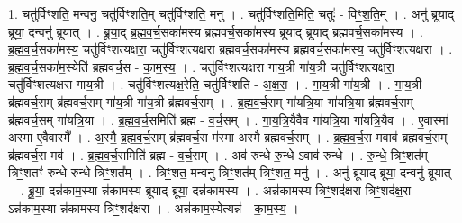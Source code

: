 \documentclass[17pt]{extarticle}
\begin{document}
1. चतु॑र्विꣳशति॒ मन्वनु॒ चतु॑र्विꣳशति॒म् चतु॑र्विꣳशति॒ मनु॑ । . चतु॑र्विꣳशति॒मिति॒ चतुः॑ - विꣳ॒॒श॒ति॒म् । . अनु॑ ब्रूयाद् ब्रूया॒ दन्वनु॑ ब्रूयात् । . ब्रू॒या॒द् ब्र॒ह्म॒व॒र्च॒सका॑मस्य ब्रह्मवर्च॒सका॑मस्य ब्रूयाद् ब्रूयाद् ब्रह्मवर्च॒सका॑मस्य । . ब्र॒ह्म॒व॒र्च॒सका॑मस्य॒ चतु॑र्विꣳशत्यक्षरा॒ चतु॑र्विꣳशत्यक्षरा ब्रह्मवर्च॒सका॑मस्य ब्रह्मवर्च॒सका॑मस्य॒ चतु॑र्विꣳशत्यक्षरा । . ब्र॒ह्म॒व॒र्च॒सका॑म॒स्येति॑ ब्रह्मवर्च॒स - का॒म॒स्य॒ । . चतु॑र्विꣳशत्यक्षरा गाय॒त्री गा॑य॒त्री चतु॑र्विꣳशत्यक्षरा॒ चतु॑र्विꣳशत्यक्षरा गाय॒त्री । . चतु॑र्विꣳशत्यक्ष॒रेति॒ चतु॑र्विꣳशति - अ॒क्ष॒रा॒ । . गा॒य॒त्री गा॑य॒त्री । . गा॒य॒त्री ब्र॑ह्मवर्च॒सम् ब्र॑ह्मवर्च॒सम् गा॑य॒त्री गा॑य॒त्री ब्र॑ह्मवर्च॒सम् । . ब्र॒ह्म॒व॒र्च॒सम् गा॑यत्रि॒या गा॑यत्रि॒या ब्र॑ह्मवर्च॒सम् ब्र॑ह्मवर्च॒सम् गा॑यत्रि॒या । . ब्र॒ह्म॒व॒र्च॒समिति॑ ब्रह्म - व॒र्च॒सम् । . गा॒य॒त्रि॒यैवैव गा॑यत्रि॒या गा॑यत्रि॒यैव । . ए॒वास्मा॑ अस्मा ए॒वैवास्मै᳚ । . अ॒स्मै॒ ब्र॒ह्म॒व॒र्च॒सम् ब्र॑ह्मवर्च॒स म॑स्मा अस्मै ब्रह्मवर्च॒सम् । . ब्र॒ह्म॒व॒र्च॒स मवाव॑ ब्रह्मवर्च॒सम् ब्र॑ह्मवर्च॒स मव॑ । . ब्र॒ह्म॒व॒र्च॒समिति॑ ब्रह्म - व॒र्च॒सम् । . अव॑ रुन्धे रु॒न्धे ऽवाव॑ रुन्धे । . रु॒न्धे॒ त्रिꣳ॒॒शत॑म् त्रिꣳ॒॒शतꣳ॑ रुन्धे रुन्धे त्रिꣳ॒॒शत᳚म् । . त्रिꣳ॒॒शत॒ मन्वनु॑ त्रिꣳ॒॒शत॑म् त्रिꣳ॒॒शत॒ मनु॑ । . अनु॑ ब्रूयाद् ब्रूया॒ दन्वनु॑ ब्रूयात् । . ब्रू॒या॒ दन्न॑काम॒स्या न्न॑कामस्य ब्रूयाद् ब्रूया॒ दन्न॑कामस्य । . अन्न॑कामस्य त्रिꣳ॒॒शद॑क्षरा त्रिꣳ॒॒शद॑क्ष॒रा ऽन्न॑काम॒स्या न्न॑कामस्य त्रिꣳ॒॒शद॑क्षरा । . अन्न॑काम॒स्येत्यन्न॑ - का॒म॒स्य॒ । \newline
\end{document}
